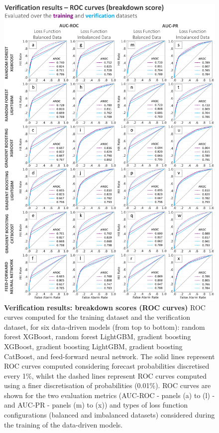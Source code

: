 \documentclass[nhess, manuscript]{copernicus}
\begin{document}
\begin{figure}[t]
\includegraphics[width=12cm]{figures/verif_training_test_breakdown_roc_curve.png}
\caption{\textbf{Verification results: breakdown scores (ROC curves)} ROC curves computed for the \textcolor{colourTraining}{training dataset} and the \textcolor{colourTest}{verification dataset}, for six data-driven models (from top to bottom): random forest XGBoost, random forest LightGBM, gradient boosting XGBoost, gradient boosting LightGBM, gradient boosting CatBoost, and feed-forward neural network. The solid lines represent ROC curves computed considering forecast probabilities discretised every 1\%, whilst the dashed lines represent ROC curves computed using a finer discretisation of probabilities (0.01\%). ROC curves are shown for the two evaluation metrics (AUC-ROC - panels (a) to (l) - and AUC-PR - panels (m) to (x)) and types of loss function configurations (balanced and imbalanced datasets) considered during the training of the data-driven models.}
\label{fig:verif_training_test_breakdown_roc_curve}
\end{figure}
\end{document}
